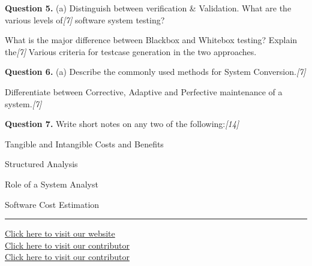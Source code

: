 \documentclass[11pt,a4paper]{article}
\newcommand{\pts}[1]{\hfill\textit{[#1]}}
\begin{document}
\medskip\noindent\textbf{Question 5.} (a) Distinguish between verification \& Validation. What are the various levels of\pts{7}
software system testing?
\begin{parts}
  \item What is the major difference between Blackbox and Whitebox testing? Explain the\pts{7}
  Various criteria for testcase generation in the two approaches.
\end{parts}

\medskip\noindent\textbf{Question 6.} (a) Describe the commonly used methods for System Conversion.\pts{7}
\begin{parts}
  \item Differentiate between Corrective, Adaptive and Perfective maintenance of a system.\pts{7}
\end{parts}

\medskip\noindent\textbf{Question 7.} Write short notes on any two of the following:\pts{14}
\begin{parts}
  \item Tangible and Intangible Costs and Benefits
  \item Structured Analysis
  \item Role of a System Analyst
  \item Software Cost Estimation
\end{parts}

\vfill
\rule{\linewidth}{0.4pt}
\begin{center}\small
\href{https://bhu-exam.vercel.app/}{Click here to visit our website}\\[4pt]\href{https://me-aryan.vercel.app/}{Click here to visit our contributor}\\[4pt]\href{https://quashan-me.vercel.app/}{Click here to visit our contributor}
\end{center}
\end{document}
